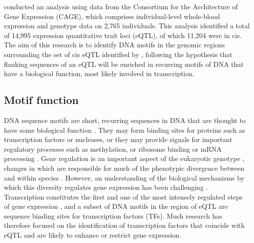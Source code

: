 \documentclass[12pt]{article}
\begin{document}
\citet{lloyd2017genetic} conducted an analysis using data from the Consortium for the Architecture of Gene Expression (CAGE), which comprises individual-level whole-blood expression and genotype data on 2,765 individuals. This analysis identified a total of 14,995 expression quantitative trait loci (eQTL), of which 11,204  were in cis. The aim of this research is to identify DNA motifs in the genomic regions surrounding the set of cis eQTL identified by \citet{lloyd2017genetic}, following the hypothesis that flanking sequences of an eQTL will be enriched in recurring motifs of DNA that have a biological function, most likely involved in transcription.

\subsection{Motif function}
DNA sequence motifs are short, recurring sequences in DNA that are thought to have some biological function \citep{d2006dna}. They may form binding sites for proteins such as transcription factors or nucleases, or they may provide signals for important regulatory processes such as methylation, or ribosome binding or mRNA processing \citep{d2006dna}. Gene regulation is an important aspect of the eukaryotic genotype \citep{beckerman2005gene}, changes in which are responsible for much of the phenotypic divergence between and within species \citep{stewart2012transcription}. However, an understanding of the biological mechanisms by which this diversity regulates gene expression has been challenging  \citep{pai2015genetic, gaffney2013global}. Transcription constitutes the first and one of the most intensely regulated steps of gene expression \citep{zabidi2016regulatory}, and a subset of DNA motifs in the region of eQTL are sequence binding sites for transcription factors (TFs). Much research has therefore focused on the identification of transcription factors that coincide with eQTL and are likely to enhance or restrict gene expression. 
\end{document}
